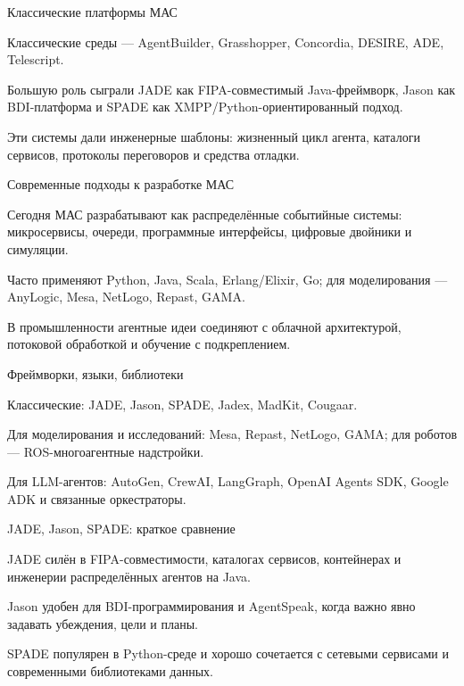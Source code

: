\begin{frame}{Классические платформы МАС}
	\topline
	\justifying
	\begin{textitemize}
		\item Классические среды --- AgentBuilder, Grasshopper, Concordia, DESIRE, ADE, Telescript.
		\item Большую роль сыграли JADE как FIPA-совместимый Java-фреймворк, Jason как BDI-платформа и SPADE как XMPP/Python-ориентированный подход.
		\item Эти системы дали инженерные шаблоны: жизненный цикл агента, каталоги сервисов, протоколы переговоров и средства отладки.
	\end{textitemize}
\end{frame}

\begin{frame}{Современные подходы к разработке МАС}
	\topline
	\justifying
	\begin{textitemize}
		\item Сегодня МАС разрабатывают как распределённые событийные системы: микросервисы, очереди, программные интерфейсы, цифровые двойники и симуляции.
		\item Часто применяют Python, Java, Scala, Erlang/Elixir, Go; для моделирования --- AnyLogic, Mesa, NetLogo, Repast, GAMA.
		\item В промышленности агентные идеи соединяют с облачной архитектурой, потоковой обработкой и обучение с подкреплением.
	\end{textitemize}
\end{frame}

\begin{frame}{Фреймворки, языки, библиотеки}
	\topline
	\justifying
	\begin{textitemize}
		\item Классические: JADE, Jason, SPADE, Jadex, MadKit, Cougaar.
		\item Для моделирования и исследований: Mesa, Repast, NetLogo, GAMA; для роботов --- ROS-многоагентные надстройки.
		\item Для LLM-агентов: AutoGen, CrewAI, LangGraph, OpenAI Agents SDK, Google ADK и связанные оркестраторы.
	\end{textitemize}
\end{frame}

\begin{frame}{JADE, Jason, SPADE: краткое сравнение}
	\topline
	\justifying
	\begin{textitemize}
		\item JADE силён в FIPA-совместимости, каталогах сервисов, контейнерах и инженерии распределённых агентов на Java.
		\item Jason удобен для BDI-программирования и AgentSpeak, когда важно явно задавать убеждения, цели и планы.
		\item SPADE популярен в Python-среде и хорошо сочетается с сетевыми сервисами и современными библиотеками данных.
	\end{textitemize}
\end{frame}

